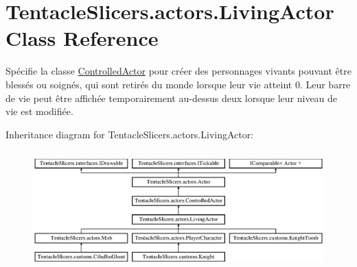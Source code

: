 \hypertarget{class_tentacle_slicers_1_1actors_1_1_living_actor}{}\section{Tentacle\+Slicers.\+actors.\+Living\+Actor Class Reference}
\label{class_tentacle_slicers_1_1actors_1_1_living_actor}


Spécifie la classe \hyperlink{class_tentacle_slicers_1_1actors_1_1_controlled_actor}{Controlled\+Actor} pour créer des personnages vivants pouvant être blessés ou soignés, qui sont retirés du monde lorsque leur vie atteint 0. Leur barre de vie peut être affichée temporairement au-\/dessus d\textquotesingle{}eux lorsque leur niveau de vie est modifiée.  


Inheritance diagram for Tentacle\+Slicers.\+actors.\+Living\+Actor\+:\begin{figure}[H]
\begin{center}
\leavevmode
\includegraphics[height=4.590164cm]{class_tentacle_slicers_1_1actors_1_1_living_actor}
\end{center}
\end{figure}
